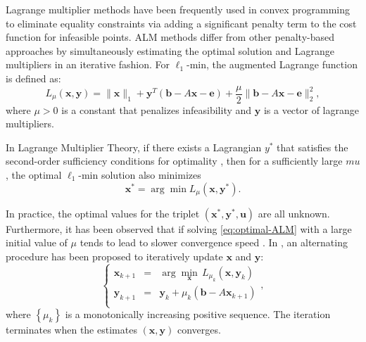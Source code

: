 \documentclass[10pt,twocolumn,letterpaper]{article}
\def\ee{{\boldsymbol{e}}}
\def\bb{{\boldsymbol{b}}}
\def\uu{{\boldsymbol{u}}}
\def\yy{{\boldsymbol{y}}}
\def\xx{{\boldsymbol{x}}}
\def\uu{{\boldsymbol{u}}}
\begin{document}
Lagrange multiplier methods have been frequently used in convex programming to eliminate equality constraints via adding a significant penalty term to the cost function for infeasible points. ALM methods differ from other penalty-based approaches by simultaneously estimating the optimal solution and Lagrange multipliers in an iterative fashion.
For $\ell_1$-min, the augmented Lagrange function is defined as:
\begin{equation}
L_\mu(\xx,\yy) = \|\xx\|_1 + \yy^T(\bb - A\xx - \ee) + \frac{\mu}{2} \| \bb-A\xx-\ee \|_2^2,
\end{equation}
where $\mu > 0$ is a constant that penalizes infeasibility and $\yy$ is a vector of lagrange multipliers.

In Lagrange Multiplier Theory, if there exists a Lagrangian $y^*$ that satisfies the second-order sufficiency conditions for optimality \cite{BertsekasD2003}, then for a sufficiently large $mu$, the optimal $\ell_1$-min solution also minimizes
\begin{equation}
\xx^* = \arg \min L_\mu(\xx,\yy^*).
\label{eq:optimal-ALM}
\end{equation}

In practice, the optimal values for the triplet $(\xx^*, \yy^*, \uu)$ are all unknown. Furthermore, it has been observed that if solving \eqref{eq:optimal-ALM} with a large initial value of $\mu$ tends to lead to slower convergence speed \cite{WrightS2008,YangA2010-ICIP}. In \cite{BertsekasD2003,YangJ2009}, an alternating procedure has been proposed to iteratively update $\xx$ and $\yy$:
\begin{equation}
\left \{
\begin{array}{lll}
\xx_{k+1} & = & \arg\min_{\xx} \, L_{\mu_k} (\xx,\yy_k)\\
\yy_{k+1} & = & \yy_k + \mu_k (\bb - A\xx_{k+1}) \\
\end{array}
\right . ,
\label{eq:alm}
\end{equation}
where $\left\{\mu_{k}\right\}$ is a monotonically increasing positive sequence. The iteration terminates when the estimates $(\xx, \yy)$ converges.
\end{document}
